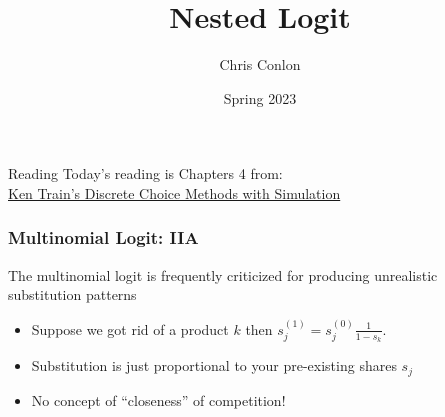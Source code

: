 

\title{Nested Logit}
\author{Chris Conlon}

\date{Spring 2023}








\begin{frame}[plain] %
\titlepage
\end{frame}


\begin{frame}{Reading}
Today's reading is Chapters 4 from:\\
\href{https://eml.berkeley.edu/books/choice2.html}{Ken Train's Discrete Choice Methods with Simulation}
\end{frame}



\begin{frame}
\frametitle{Multinomial Logit: IIA}
The multinomial logit is frequently criticized for producing unrealistic substitution patterns
\begin{itemize}
\item Suppose we got rid of a product $k$ then $s_j^{(1)} = s_j^{(0)} \frac{1}{1- s_k}$.
\item Substitution is just proportional to your pre-existing shares $s_j$
\item No concept of ``closeness'' of competition!
\end{itemize}
\end{frame}


